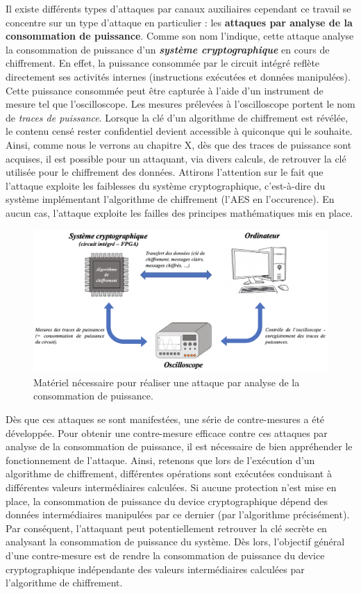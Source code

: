 \documentclass[oneside]{book}
\begin{document}
\newpage
Il existe différents types d'attaques par canaux auxiliaires cependant ce travail se concentre sur un type d'attaque en particulier : les \textbf{attaques par analyse de la consommation de puissance}. Comme son nom l'indique, cette attaque analyse la consommation de puissance d'un \textbf{\textit{système cryptographique}} en cours de chiffrement. En effet, la puissance consommée par le circuit intégré reflète directement ses activités internes (instructions exécutées et données manipulées). Cette puissance consommée peut être capturée à l'aide d'un instrument de mesure tel que l'oscilloscope. Les mesures prélevées à l'oscilloscope portent le nom de \textit{traces de puissance}. Lorsque la clé d'un algorithme de chiffrement est révélée, le contenu censé rester confidentiel devient accessible à quiconque qui le souhaite. Ainsi, comme nous le verrons au chapitre X, dès que des traces de puissance sont acquises, il est possible pour un attaquant, via divers calculs, de retrouver la clé utilisée pour le chiffrement des données. Attirons l'attention sur le fait que l'attaque exploite les faiblesses du système cryptographique, c'est-à-dire du système implémentant l'algorithme de chiffrement (l'AES en l'occurence). En aucun cas, l'attaque exploite les failles des principes mathématiques mis en place.

\begin{figure}[h]
    \hspace{-1.55cm}
    \includegraphics[scale=0.72]{image/intro.png}
    \caption{Matériel nécessaire pour réaliser une attaque par analyse de la consommation de puissance.}
    \label{fig:intro}
\end{figure}

Dès que ces attaques se sont manifestées, une série de contre-mesures a été développée. Pour obtenir une contre-mesure efficace contre ces attaques par analyse de la consommation de puissance, il est nécessaire de bien appréhender le fonctionnement de l'attaque. Ainsi, retenons que lors de l’exécution d’un algorithme de chiffrement, différentes opérations sont exécutées conduisant à différentes valeurs intermédiaires calculées. Si aucune protection n’est mise en place, la consommation de puissance du device cryptographique dépend des données intermédiaires manipulées par ce dernier (par l’algorithme précisément). Par conséquent, l’attaquant peut potentiellement retrouver la clé secrète en analysant la consommation de puissance du système. Dès lors, l'objectif général d'une contre-mesure est de rendre la consommation de puissance du device cryptographique indépendante des valeurs intermédiaires calculées par l'algorithme de chiffrement. 
\end{document}
